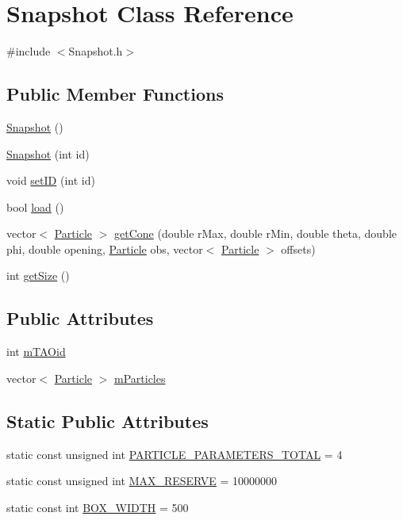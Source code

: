 \hypertarget{classSnapshot}{}\section{Snapshot Class Reference}
\label{classSnapshot}


{\ttfamily \#include $<$Snapshot.\+h$>$}

\subsection*{Public Member Functions}
\begin{DoxyCompactItemize}
\item 
\hyperlink{classSnapshot_afbb9ea1d6bd1c57817fb2de4484d19e5}{Snapshot} ()
\item 
\hyperlink{classSnapshot_a187303891773ed25d50f0c8904543ad3}{Snapshot} (int id)
\item 
void \hyperlink{classSnapshot_af32d0c9dff01edc6fc7123c68acd90b2}{set\+I\+D} (int id)
\item 
bool \hyperlink{classSnapshot_a316f9251424c8b828aad00282264fef4}{load} ()
\item 
vector$<$ \hyperlink{structParticle}{Particle} $>$ \hyperlink{classSnapshot_ad2180a60828caf9312a95cf1290177f2}{get\+Cone} (double r\+Max, double r\+Min, double theta, double phi, double opening, \hyperlink{structParticle}{Particle} obs, vector$<$ \hyperlink{structParticle}{Particle} $>$ offsets)
\item 
int \hyperlink{classSnapshot_afcaaea0e25497ab47e1ac6cdc04cd27c}{get\+Size} ()
\end{DoxyCompactItemize}
\subsection*{Public Attributes}
\begin{DoxyCompactItemize}
\item 
int \hyperlink{classSnapshot_a819b00f164775a0ec42023903ebb20ee}{m\+T\+A\+Oid}
\item 
vector$<$ \hyperlink{structParticle}{Particle} $>$ \hyperlink{classSnapshot_a96ba382e41a4fa8bd4de0e3e999be8f1}{m\+Particles}
\end{DoxyCompactItemize}
\subsection*{Static Public Attributes}
\begin{DoxyCompactItemize}
\item 
static const unsigned int \hyperlink{classSnapshot_a651f859c63b47954020a0c08340892cc}{P\+A\+R\+T\+I\+C\+L\+E\+\_\+\+P\+A\+R\+A\+M\+E\+T\+E\+R\+S\+\_\+\+T\+O\+T\+A\+L} = 4
\item 
static const unsigned int \hyperlink{classSnapshot_a7e222bfbf93befc22df564ff28feed1b}{M\+A\+X\+\_\+\+R\+E\+S\+E\+R\+V\+E} = 10000000
\item 
static const int \hyperlink{classSnapshot_a6edbe239bf4d9b591ab205e467dbf34c}{B\+O\+X\+\_\+\+W\+I\+D\+T\+H} = 500
\end{DoxyCompactItemize}


